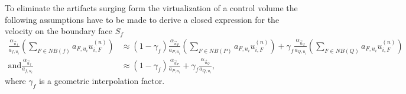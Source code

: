   To eliminate the artifacts surging form the virtualization of a control volume the following assumptions have to be made to derive a closed expression for the velocity on the boundary face \(S_f\)
  \begin{subequations}
    \label{eq:approxpwim}
  \begin{align}
    \frac{\alpha_{\vec{u}_f}}{a_{f,u_i}} \left(\sum_{F \in NB(f)} a_{F,u_i} u_{i,F}^{(n)} \right)
    &\approx
    \left(1-\gamma_f\right) \frac{\alpha_{\vec{u}_P}}{a_{P,u_i}} \left(\sum_{F \in NB(P)} a_{F,u_i} u_{i,F}^{(n)} \right)
    +
    \gamma_f \frac{\alpha_{\vec{u}_Q}}{a_{Q,u_i}} \left(\sum_{F \in NB(Q)} a_{F,u_i} u_{i,F}^{(n)} \right) \\[1em]
    \text{and}
    \frac{\alpha_{\vec{u}_f}}{a_{f,u_i}} 
    &\approx
    \left(1-\gamma_f\right) \frac{\alpha_{\vec{u}_P}}{a_{P,u_i}} 
    +
    \gamma_f \frac{\alpha_{\vec{u}_Q}}{a_{Q,u_i}},
  \end{align}
  \end{subequations}
  where \(\gamma_f\) is a geometric interpolation factor. 

